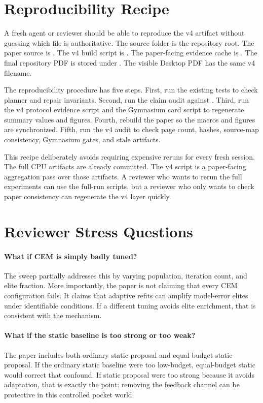 \section{Reproducibility Recipe}
\label{app:repro-recipe}

A fresh agent or reviewer should be able to reproduce the v4 artifact without
guessing which file is authoritative. The source folder is the repository root.
The paper source is . The v4 build script
is . The paper-facing evidence cache is
. The final repository PDF is stored under
. The visible Desktop PDF has the same v4 filename.

The reproducibility procedure has five steps. First, run the existing tests to
check planner and repair invariants. Second, run the claim audit against
. Third, run the v4 protocol evidence script and the
Gymnasium card script to regenerate summary values and figures. Fourth, rebuild
the paper so the macros and figures are synchronized. Fifth, run the v4 audit
to check page count, hashes, source-map consistency, Gymnasium gates, and stale
artifacts.

This recipe deliberately avoids requiring expensive reruns for every fresh
session. The full CPU artifacts are already committed. The v4 script is a
paper-facing aggregation pass over those artifacts. A reviewer who wants to
rerun the full experiments can use the full-run scripts, but a reviewer who
only wants to check paper consistency can regenerate the v4 layer quickly.

\section{Reviewer Stress Questions}
\label{app:stress-questions}

\paragraph{What if CEM is simply badly tuned?}
The sweep partially addresses this by varying population, iteration count, and
elite fraction. More importantly, the paper is not claiming that every CEM
configuration fails. It claims that adaptive refits can amplify model-error
elites under identifiable conditions. If a different tuning avoids elite
enrichment, that is consistent with the mechanism.

\paragraph{What if the static baseline is too strong or too weak?}
The paper includes both ordinary static proposal and equal-budget static
proposal. If the ordinary static baseline were too low-budget, equal-budget
static would correct that confound. If static proposal were too strong because
it avoids adaptation, that is exactly the point: removing the feedback channel
can be protective in this controlled pocket world.

